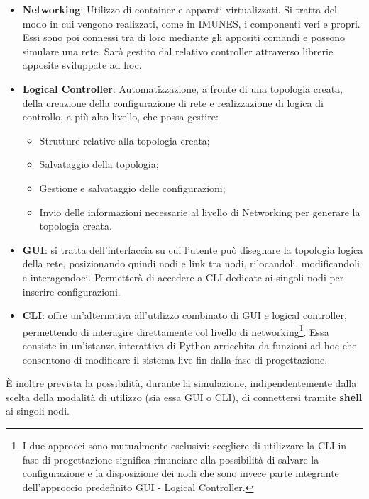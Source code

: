 \begin{itemize}
    \item \textbf{Networking}: Utilizzo di container e apparati virtualizzati. Si tratta del modo in cui vengono realizzati, come in IMUNES, i componenti veri e propri. Essi sono poi connessi tra di loro mediante gli appositi comandi e possono simulare una rete. Sarà gestito dal relativo controller attraverso librerie apposite sviluppate ad hoc.
    \item \textbf{Logical Controller}: Automatizzazione, a fronte di una topologia creata, della creazione della configurazione di rete e realizzazione di logica di controllo, a più alto livello, che possa gestire:
          \begin{itemize}
              \item Strutture relative alla topologia creata;
              \item Salvataggio della topologia;
              \item Gestione e salvataggio delle configurazioni;
              \item Invio delle informazioni necessarie al livello di Networking per generare la topologia creata.
          \end{itemize}
    \item \textbf{GUI}: si tratta dell'interfaccia su cui l'utente può disegnare la topologia logica della rete, posizionando quindi nodi e link tra nodi, rilocandoli, modificandoli e interagendoci.
    Permetterà di accedere a CLI dedicate ai singoli nodi per inserire configurazioni.
    \item \textbf{CLI}: offre un'alternativa all'utilizzo combinato di GUI e logical controller, permettendo di interagire direttamente col livello di networking\footnote{I due approcci sono mutualmente esclusivi: scegliere di utilizzare la CLI in fase di progettazione significa rinunciare alla possibilità di salvare la configurazione e la disposizione dei nodi che sono invece parte integrante dell'approccio predefinito GUI - Logical Controller.}. Essa consiste in un'istanza interattiva di Python arricchita da funzioni ad hoc che consentono di modificare il sistema live fin dalla fase di progettazione.
\end{itemize}
È inoltre prevista la possibilità, durante la simulazione, indipendentemente dalla scelta della modalità di utilizzo (sia essa GUI o CLI), di connettersi tramite \textbf{shell} ai singoli nodi.



\newpage
